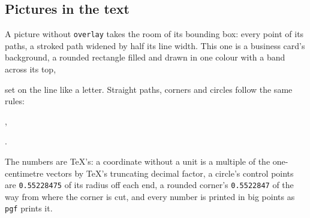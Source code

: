 \documentclass{article}
\numberwithin{equation}{section}
\theoremstyle{definition}
\theoremstyle{remark}
\begin{document}
\subsection{Pictures in the text}\label{sec:tikzpaths}
A picture without \texttt{overlay} takes the room of its bounding box: every point of its
paths, a stroked path widened by half its line width. This one is a business card's
background, a rounded rectangle filled and drawn in one colour with a band across its top,
set on the line like a letter. Straight paths, corners and circles follow the same rules:
,
.

\noindent{}\quad
The numbers are \TeX's: a coordinate without a unit is a multiple of the one-centimetre
vectors by \TeX's truncating decimal factor, a circle's control points are
\texttt{0.55228475} of its radius off each end, a rounded corner's
\texttt{0.5522847} of the way from where the corner is cut, and every number is printed in
big points as \texttt{pgf} prints it.
\end{document}

